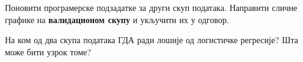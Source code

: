 \item {}
Поновити програмерске подзадатке за други скуп података. Направити сличне графике на \textbf{валидационом скупу} и укључити их у одговор.

На ком од два скупа података ГДА ради лошије од логистичке регресије? Шта може бити узрок томе?

